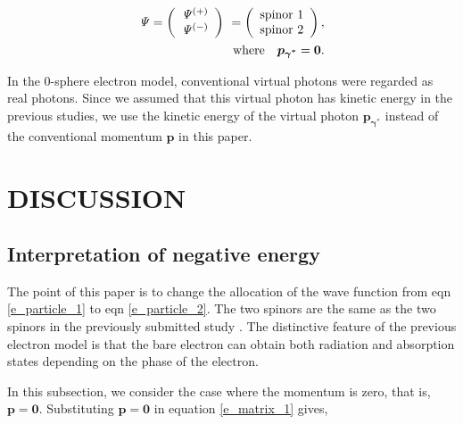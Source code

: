 \documentclass[%
 reprint,
 amsmath,amssymb,
 aps,
]{revtex4-1}
\numberwithin{equation}{section}%
\begin{document}
        \begin{align}
            \it\Psi =
                \left( 
                    \begin{array}{c}
                        \it\Psi^{(+)} \\ \it\Psi^{(-)}
                    \end{array}
                \right) \
            =
                \left(
                    \begin{array}{c}
                        \mathrm{spinor \ 1} \\ \mathrm{spinor \ 2}
                    \end{array}
                \right)
                ,
            \notag
            \\
            \mathrm{where} \ \ \ \bm{p_{\gamma^{*}}} = \bm{0}
            .
        \label{e_particle_2_1}
        \end{align}    


    In the 0-sphere electron model, conventional virtual photons were regarded as real photons. Since we assumed that this virtual photon has kinetic energy in the previous studies, we use the kinetic energy of the virtual photon $ \bm{p_{\gamma^{*}}} $ instead of the conventional momentum $\bm{p}$ in this paper.




\section{\label{sec:XXXX}DISCUSSION}


\subsection{
    \label{sec:Interpretation of negative energy}
        Interpretation of negative energy}


    The point of this paper is to change the allocation of the wave function from eqn \ref{e_particle_1} to eqn \ref{e_particle_2}. The two spinors are the same as the two spinors in the previously submitted study \cite{Hanamura1}. The distinctive feature of the previous electron model is that the bare electron can obtain both radiation and absorption states depending on the phase of the electron.

    In this subsection, we consider the case where the momentum is zero, that is, $ \bm{p} = \bm{0} $. Substituting $ \bm{p} = \bm{0} $ in equation \ref{e_matrix_1} gives,
    
\end{document}
